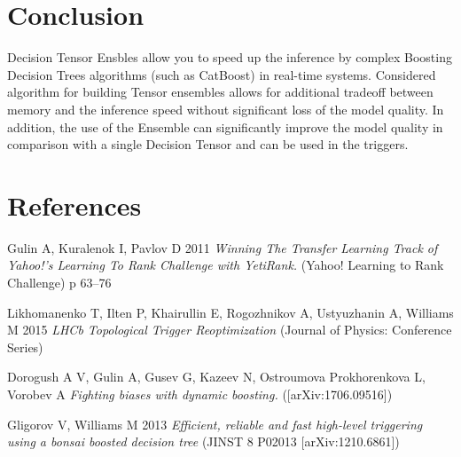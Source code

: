 \documentclass[a4paper]{jpconf}
\begin{document}
\section{Conclusion}

Decision Tensor Ensbles allow you to speed up the inference by complex Boosting Decision Trees algorithms (such as CatBoost) in real-time systems. Considered algorithm for building Tensor ensembles allows for additional tradeoff between memory and the inference speed without significant loss of the model quality.
In addition, the use of the Ensemble can significantly improve the model quality in comparison with a single Decision Tensor and can be used in the triggers.


\section*{References}
\item Gulin A, Kuralenok I, Pavlov D 2011 {\it Winning The Transfer Learning Track of Yahoo!'s Learning To Rank Challenge with YetiRank.} (Yahoo! Learning to Rank Challenge) p 63--76
\item Likhomanenko T, Ilten P, Khairullin E, Rogozhnikov A, Ustyuzhanin A, Williams M 2015 {\it LHCb Topological Trigger Reoptimization} (Journal of Physics: Conference Series)
\item Dorogush A V, Gulin A, Gusev G, Kazeev N, Ostroumova Prokhorenkova L, Vorobev A {\it Fighting biases with dynamic boosting.} ([arXiv:1706.09516])
\item Gligorov V, Williams M 2013 {\it Efficient, reliable and fast high-level triggering using a bonsai boosted decision tree} (JINST 8 P02013 [arXiv:1210.6861])
\endnumrefs
\end{document}
